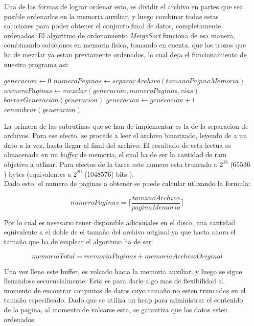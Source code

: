 \documentclass[11pt]{article}
\begin{document}
	Una de las formas de lograr ordenar esto, es dividir el archivo en partes que sea posible ordenarlas en la memoria auxiliar, y luego combinar todas estas soluciones para poder obtener el conjunto final de datos, completamente ordenados. El algoritmo de ordenamiento \textit{MergeSort} funciona de esa manera, combinando soluciones en memoria fisica, tomando en cuenta, que los trozos que ha de mezclar ya estan previamente ordenados, lo cual deja el funcionamiento de nuestro programa asi:
	
		\begin{algorithm}[H]
		\caption{$principal(vias)$}
		\label{alg_programaPrincipal}
		\begin{algorithmic}   
			\STATE $generacion \leftarrow 0$
			\STATE $numeroPaginas \leftarrow separarArchivo(tamanoPaginaMemoria)$
				\STATE $numeroPaginas \leftarrow mezclar( generacion, numeroPaginas, vias)$
				\STATE $borrarGeneracion(generacion)$
				\STATE $generacion \leftarrow generacion + 1$
			\ENDWHILE
			\STATE $renombrar(generacion)$
		\end{algorithmic}
		\end{algorithm}
	
	La primera de las subrutinas que se han de implementar es la de la separacion de archivos. Para ese efecto, se procede a leer el archivo binarizado, leyendo de a un dato a la vez, hasta llegar al final del archivo. El resultado de esta lectua es almacenada en un \textit{buffer} de memoria, el cual ha de ser la cantidad de ram objetivo a utlizar. Para efectos de la tarea este numero esta truncado a $2^16 $ ($65536$) bytes (equivalentes a $2^20$ ($1048576$) bits ).\\
	
	Dado esto, el numero de paginas a obtener se puede calcular utlizando la formula:
	
	$$
		numeroPaginas = \lceil\frac{tamanoArchivo}{paginaMemoria}\rceil
	$$
	
	Por lo cual es nesesario tener disponible adicionales en el disco, una cantidad equivalente a el doble de el tamaño del archivo original ya que hasta ahora el tamaño que ha de emplear el algoritmo ha de ser:
	
	$$
		memoriaTotal = memoriaPaginas + memoriaArchivoOriginal
	$$
	
	Una vez lleno este buffer, es volcado hacia la memoria auxiliar, y luego se sigue llenandose secuencialmente. Esto es para darle algo mas de flexibilidad al momento de encontrar conjuntos de datos cuyo tamaño no esten truncados en el tamaño especificado. Dado que se utiliza un heap para administrar el contenido de la pagina, al momento de volcarse esta, se garantiza que los datos esten ordenados.
	
\end{document}
